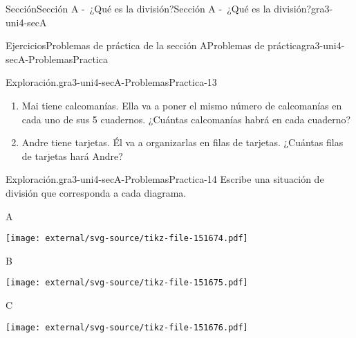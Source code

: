\documentclass[twoside,14pt,]{extarticle}
\begin{document}
\begin{sectionptx}{Sección}{Sección A -~¿Qué es la división?}{}{Sección A -~¿Qué es la división?}{}{}{gra3-uni4-secA}
\begin{exercises-subsection}{Ejercicios}{Problemas de práctica de la sección A}{}{Problemas de práctica}{}{}{gra3-uni4-secA-ProblemasPractica}
\begin{divisionexercise}{11}{Exploración.}{}{gra3-uni4-secA-ProblemasPractica-13}
%
\begin{enumerate}[label=(\alph*)]
\item{}Mai tiene \textunderscore{}\textunderscore{}\textunderscore{}\textunderscore{}\textunderscore{}\textunderscore{}\textunderscore{}\textunderscore{}\textunderscore{}\textunderscore{} calcomanías. Ella va a poner el mismo número de calcomanías en cada uno de sus 5 cuadernos. ¿Cuántas calcomanías habrá en cada cuaderno?%
\item{}Andre tiene \textunderscore{}\textunderscore{}\textunderscore{}\textunderscore{}\textunderscore{}\textunderscore{}\textunderscore{}\textunderscore{}\textunderscore{}\textunderscore{} tarjetas. Él va a organizarlas en filas de \textunderscore{}\textunderscore{}\textunderscore{}\textunderscore{}\textunderscore{}\textunderscore{}\textunderscore{}\textunderscore{}\textunderscore{}\textunderscore{} tarjetas. ¿Cuántas filas de tarjetas hará Andre?%
\end{enumerate}
%
\end{divisionexercise}%
\begin{divisionexercise}{12}{Exploración.}{}{gra3-uni4-secA-ProblemasPractica-14}%
Escribe una situación de división que corresponda a cada diagrama.%
\begin{sidebyside}{6}{0.00333333333333333}{0.00333333333333333}{0.00666666666666667}%
\begin{sbspanel}{0.02}%
A%
\end{sbspanel}%
\begin{sbspanel}{0.3}%
\texttt{[image: external/svg-source/tikz-file-151674.pdf]}
\end{sbspanel}%
\begin{sbspanel}{0.02}%
B%
\end{sbspanel}%
\begin{sbspanel}{0.3}%
\texttt{[image: external/svg-source/tikz-file-151675.pdf]}
\end{sbspanel}%
\begin{sbspanel}{0.02}%
C%
\end{sbspanel}%
\begin{sbspanel}{0.3}%
\texttt{[image: external/svg-source/tikz-file-151676.pdf]}
\end{sbspanel}%
\end{sidebyside}%
\end{divisionexercise}%
\end{exercises-subsection}
%
%
\typeout{************************************************}

\end{sectionptx}
\end{document}
